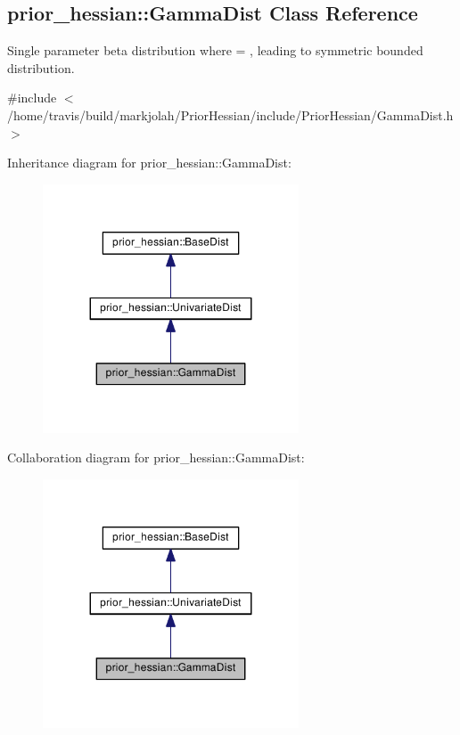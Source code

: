 \hypertarget{classprior__hessian_1_1GammaDist}{}\subsection{prior\+\_\+hessian\+:\+:Gamma\+Dist Class Reference}
\label{classprior__hessian_1_1GammaDist}


Single parameter beta distribution where  = , leading to symmetric bounded distribution.  




{\ttfamily \#include $<$/home/travis/build/markjolah/\+Prior\+Hessian/include/\+Prior\+Hessian/\+Gamma\+Dist.\+h$>$}



Inheritance diagram for prior\+\_\+hessian\+:\+:Gamma\+Dist\+:\nopagebreak
\begin{figure}[H]
\begin{center}
\leavevmode
\includegraphics[width=215pt]{classprior__hessian_1_1GammaDist__inherit__graph}
\end{center}
\end{figure}


Collaboration diagram for prior\+\_\+hessian\+:\+:Gamma\+Dist\+:\nopagebreak
\begin{figure}[H]
\begin{center}
\leavevmode
\includegraphics[width=215pt]{classprior__hessian_1_1GammaDist__coll__graph}
\end{center}
\end{figure}
